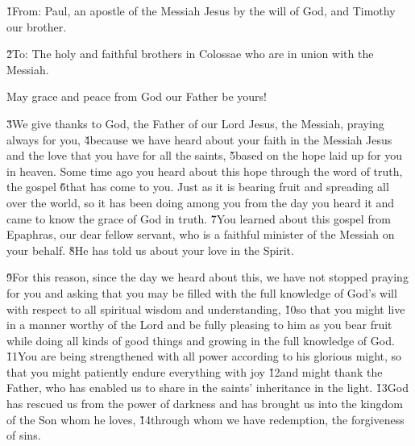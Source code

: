 


\v{1}From: Paul, an apostle of the Messiah Jesus by the will of God, and Timothy our brother.

\v{2}To: The holy and faithful brothers in Colossae who are in union with the Messiah.

May grace and peace from God our Father be yours!

\v{3}We give thanks to God, the Father of our Lord Jesus, the Messiah, praying always for you, \v{4}because we have heard about your faith in the Messiah Jesus and the love that you have for all the saints, \v{5}based on the hope laid up for you in heaven. Some time ago you heard about this hope through the word of truth, the gospel \v{6}that has come to you. Just as it is bearing fruit and spreading all over the world, so it has been doing among you from the day you heard it and came to know the grace of God in truth. \v{7}You learned about this gospel from Epaphras, our dear fellow servant, who is a faithful minister of the Messiah on your behalf. \v{8}He has told us about your love in the Spirit.

\v{9}For this reason, since the day we heard about this, we have not stopped praying for you and asking that you may be filled with the full knowledge of God's will with respect to all spiritual wisdom and understanding, \v{10}so that you might live in a manner worthy of the Lord and be fully pleasing to him as you bear fruit while doing all kinds of good things and growing in the full knowledge of God. \v{11}You are being strengthened with all power according to his glorious might, so that you might patiently endure everything with joy \v{12}and might thank the Father, who has enabled us to share in the saints' inheritance in the light. \v{13}God has rescued us from the power of darkness and has brought us into the kingdom of the Son whom he loves, \v{14}through whom we have redemption, the forgiveness of sins.

